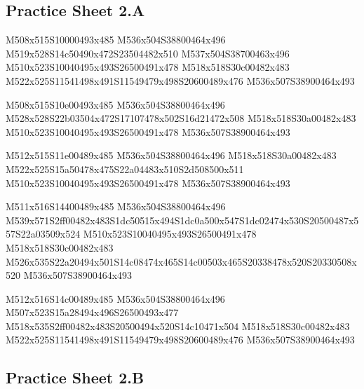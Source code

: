 \documentclass{article}
\begin{document}
\subsection{Practice Sheet 2.A}

\begin{multicols}{5}
\begin{center}

M508x515S10000493x485 %
M536x504S38800464x496 %
M519x528S14c50490x472S23504482x510 %
M537x504S38700463x496 %
M510x523S10040495x493S26500491x478 %
M518x518S30c00482x483 %
M522x525S11541498x491S11549479x498S20600489x476 %
M536x507S38900464x493 %
\vfil
\columnbreak

M508x515S10e00493x485 %
M536x504S38800464x496 %
M528x528S22b03504x472S17107478x502S16d21472x508 %
M518x518S30a00482x483 %
M510x523S10040495x493S26500491x478 %
M536x507S38900464x493 %
\vfil
\columnbreak

M512x515S11e00489x485 %
M536x504S38800464x496 %
M518x518S30a00482x483 %
M522x525S15a50478x475S22a04483x510S2d508500x511 %
M510x523S10040495x493S26500491x478 %
M536x507S38900464x493 %
\vfil
\columnbreak

M511x516S14400489x485 %
M536x504S38800464x496 %
M539x571S2ff00482x483S1dc50515x494S1dc0a500x547S1dc02474x530S20500487x557S22a03509x524 %
M510x523S10040495x493S26500491x478 %
M518x518S30c00482x483 %
M526x535S22a20494x501S14c08474x465S14c00503x465S20338478x520S20330508x520 %
M536x507S38900464x493 %
\vfil
\columnbreak

M512x516S14c00489x485 %
M536x504S38800464x496 %
M507x523S15a28494x496S26500493x477 %
M518x535S2ff00482x483S20500494x520S14c10471x504 %
M518x518S30c00482x483 %
M522x525S11541498x491S11549479x498S20600489x476 %
M536x507S38900464x493 %
\vfil

\end{center}
\end{multicols}

\subsection{Practice Sheet 2.B}
\end{document}
